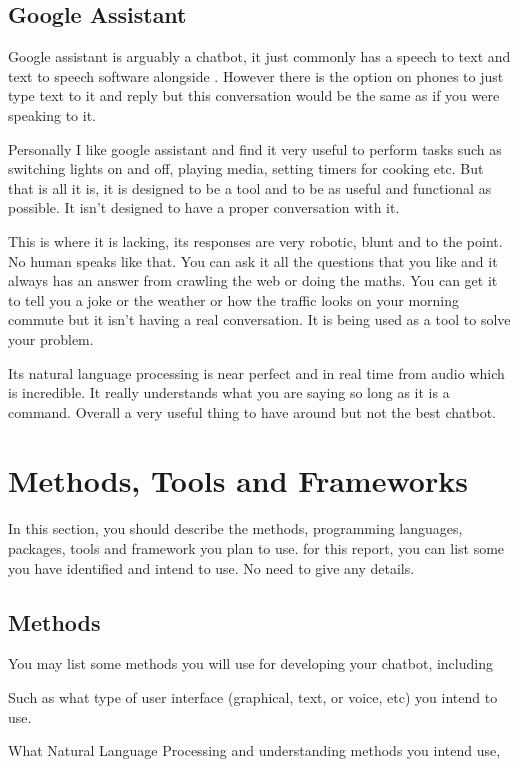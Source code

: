 \documentclass[11pt]{article}
\begin{document}
	\subsection{Google Assistant}
	Google assistant is arguably a chatbot, it just commonly has a speech to text and text to speech software alongside \citet{Google Assistant}. However there is the option on phones to just type text to it and reply but this conversation would be the same as if you were speaking to it.
	
	Personally I like google assistant and find it very useful to perform tasks such as switching lights on and off, playing media, setting timers for cooking etc. But that is all it is, it is designed to be a tool and to be as useful and functional as possible. It isn't designed to have a proper conversation with it. 
	
	This is where it is lacking, its responses are very robotic, blunt and to the point. No human speaks like that. You can ask it all the questions that you like and it always has an answer from crawling the web or doing the maths. You can get it to tell you a joke or the weather or how the traffic looks on your morning commute but it isn't having a real conversation. It is being used as a tool to solve your problem.
	
	Its natural language processing is near perfect and in real time from audio which is incredible. It really understands what you are saying so long as it is a command. Overall a very useful thing to have around but not the best chatbot.	
	
	\section{Methods, Tools and Frameworks}
	In this section, you should describe the methods, programming languages, packages, tools and framework you plan to use.
	for this report, you can list some you have identified and intend to use.
	No need to give any details.     
	
	\subsection{Methods}
	
	You may list some methods you will use for developing your chatbot, including 
	
	Such as what type of user interface (graphical, text, or voice, etc) you intend to use.
	
	What Natural Language Processing and understanding methods you intend use, 
	
\end{document}
